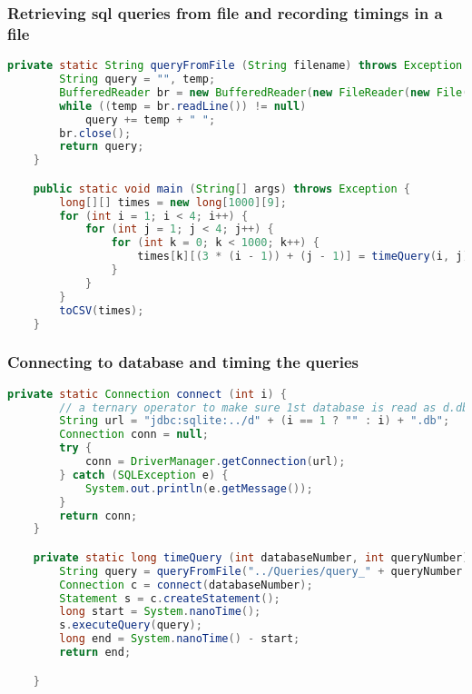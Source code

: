 \documentclass[12pt,arial]{article}
\begin{document}
\subsubsection{Retrieving sql queries from file and recording timings in a file}
\begin{lstlisting}[language=java]
	  private static String queryFromFile (String filename) throws Exception {
        String query = "", temp;
        BufferedReader br = new BufferedReader(new FileReader(new File(filename)));
        while ((temp = br.readLine()) != null)
            query += temp + " ";
        br.close();
        return query;
    }

    public static void main (String[] args) throws Exception {
        long[][] times = new long[1000][9];
        for (int i = 1; i < 4; i++) {
            for (int j = 1; j < 4; j++) {
                for (int k = 0; k < 1000; k++) {
                    times[k][(3 * (i - 1)) + (j - 1)] = timeQuery(i, j);
                }
            }
        }
        toCSV(times);
    }
\end{lstlisting}
\subsubsection{Connecting to database and timing the queries}
\begin{lstlisting}[language=java]
	private static Connection connect (int i) {
        // a ternary operator to make sure 1st database is read as d.db
        String url = "jdbc:sqlite:../d" + (i == 1 ? "" : i) + ".db";
        Connection conn = null;
        try {
            conn = DriverManager.getConnection(url);
        } catch (SQLException e) {
            System.out.println(e.getMessage());
        }
        return conn;
    }

    private static long timeQuery (int databaseNumber, int queryNumber) throws Exception {
        String query = queryFromFile("../Queries/query_" + queryNumber + "_db" + databaseNumber + ".sql");
        Connection c = connect(databaseNumber);
        Statement s = c.createStatement();
        long start = System.nanoTime();
        s.executeQuery(query);
        long end = System.nanoTime() - start;
        return end;

    }
\end{lstlisting}
\end{document}
